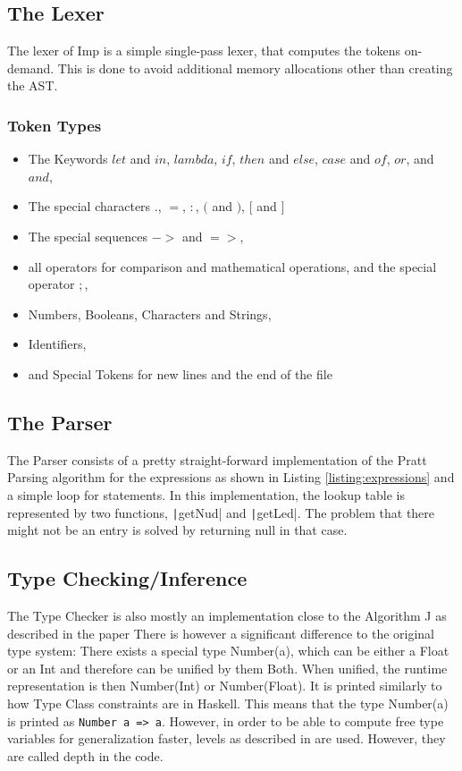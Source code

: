 \documentclass[12pt]{article}
\begin{document}
\subsection{The Lexer}
The lexer of Imp is a simple single-pass lexer, that computes
the tokens on-demand. This is done to avoid additional memory
allocations other than creating the AST.

\subsubsection{Token Types}
\begin{itemize}
      \item The Keywords $let$ and $in$, $lambda$, $if$, $then$ and $else$,
            $case$ and $of$, $or$, and $and$,
      \item The special characters $.$, $=$, $:$, $($ and $)$, $[$ and $]$
      \item The special sequences $->$ and $=>$,
      \item all operators for comparison and mathematical operations,
            and the special operator $;$,
      \item Numbers, Booleans, Characters and Strings,
      \item Identifiers,
      \item and Special Tokens for new lines and the end of the file
\end{itemize}

\subsection{The Parser}


The Parser consists of a pretty straight-forward implementation of the Pratt Parsing algorithm
for the expressions as shown in Listing \ref{listing:expressions} and a simple loop for statements.
In this implementation, the lookup table is represented by two functions,
\texttt|getNud| and \texttt|getLed|.
The problem that there might not be an entry is solved by returning null
in that case.

\subsection{Type Checking/Inference}
The Type Checker is also mostly an implementation close to the Algorithm J as described
in the paper \cite{damasPrincipalTypeschemesFunctional1982}
There is however a significant difference to the original type system:
There exists a special type Number(a), which can be either a Float or an Int
and therefore can be unified by them Both. When unified, the runtime representation
is then Number(Int) or Number(Float).
It is printed similarly to how Type Class constraints are in Haskell.
This means that the type Number(a) is printed as \texttt{Number a => a}.
However, in order to be able to compute free type variables for generalization
faster, levels as described in \cite{EfficientInsightfulGeneralization} are
used. However, they are called depth in the code.
\end{document}
